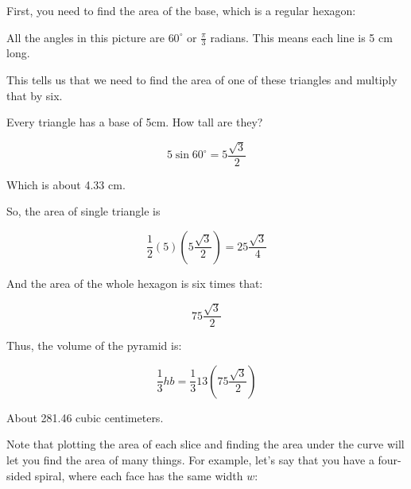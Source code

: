 \begin{Answer}[ref=pyramid_volume]
  First, you need to find the area of the base, which is a regular hexagon:
  

All the angles in this picture are $60^\circ$ or $\frac{\pi}{3}$
radians. This means each line is 5 cm long.

This tells us that we need to find the area of one of these triangles and multiply that by six.

Every triangle has a base of 5cm. How tall are they?


$$5 \sin{60^\circ} = 5\frac{\sqrt{3}}{2}$$

Which is about 4.33 cm.

So, the area of single triangle is 

$$\frac{1}{2} (5) \left( 5\frac{\sqrt{3}}{2} \right) = 25 \frac{\sqrt{3}} {4}$$

And the area of the whole hexagon is six times that:

$$75 \frac{\sqrt{3}}{2}$$

Thus, the volume of the pyramid is:

$$\frac{1}{3}h b = \frac{1}{3} 13 \left(75 \frac{\sqrt{3}}{2}\right)$$

About 281.46 cubic centimeters.

\end{Answer}

Note that plotting the area of each slice and finding the area under
the curve will let you find the area of many things.  For example,
let's say that you have a four-sided spiral, where each face has the
same width $w$:

